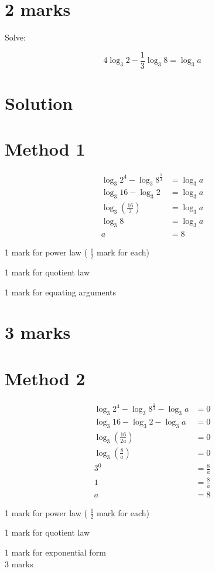 \documentclass[10pt]{article}
\begin{document}
\section*{2 marks}
Solve:

$$
4 \log _{3} 2-\frac{1}{3} \log _{3} 8=\log _{3} a
$$

\section*{Solution}
\section*{Method 1}
$$
\begin{aligned}
\log _{3} 2^{4}-\log _{3} 8^{\frac{1}{3}} & =\log _{3} a \\
\log _{3} 16-\log _{3} 2 & =\log _{3} a \\
\log _{3}\left(\frac{16}{2}\right) & =\log _{3} a \\
\log _{3} 8 & =\log _{3} a \\
a & =8
\end{aligned}
$$

1 mark for power law ( $\frac{1}{2}$ mark for each)

1 mark for quotient law

1 mark for equating arguments

\section*{3 marks}
\section*{Method 2}
$$
\begin{aligned}
\log _{3} 2^{4}-\log _{3} 8^{\frac{1}{3}}-\log _{3} a & =0 \\
\log _{3} 16-\log _{3} 2-\log _{3} a & =0 \\
\log _{3}\left(\frac{16}{2 a}\right) & =0 \\
\log _{3}\left(\frac{8}{a}\right) & =0 \\
3^{0} & =\frac{8}{a} \\
1 & =\frac{8}{a} \\
a & =8
\end{aligned}
$$

1 mark for power law ( $\frac{1}{2}$ mark for each)

1 mark for quotient law

1 mark for exponential form\\
3 marks
\end{document}
